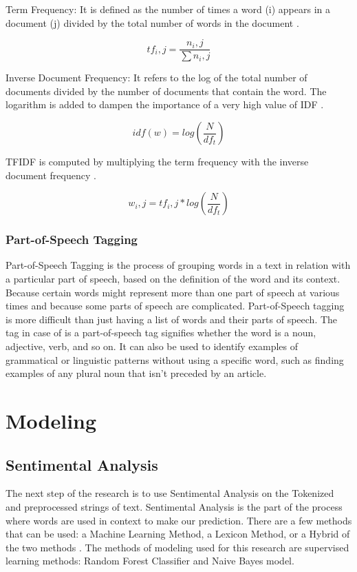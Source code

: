 \documentclass{article}
\begin{document}
Term Frequency: It is defined as the number of times a word (i) appears in a document (j) divided by the total number of words in the document \cite{11}.

\[t f_i,j = \frac{n_i,j}{\sum n_i,j}\]
     

Inverse Document Frequency: It refers to the log of the total number of documents divided by the number of documents that contain the word. The logarithm is added to dampen the importance of a very high value of IDF \cite{11}.

\[idf(w) = log(\frac{N}{df_t})\]
      

TFIDF is computed by multiplying the term frequency with the inverse document frequency \cite{11}.

\[w_i,j = {tf_i,j} * log(\frac{N}{df_t})\]



\subsubsection{Part-of-Speech Tagging}

Part-of-Speech Tagging is the process of grouping words in a text in relation with a particular part of speech, based on the definition of the word and its context. Because certain words might represent more than one part of speech at various times and because some parts of speech are complicated. Part-of-Speech tagging is more difficult than just having a list of words and their parts of speech. The tag in case of is a part-of-speech tag signifies whether the word is a noun, adjective, verb, and so on. It can also be used to identify examples of grammatical or linguistic patterns without using a specific word, such as finding examples of any plural noun that isn't preceded by an article.



\section{Modeling}

\subsection{Sentimental Analysis}
The next step of the research is to use Sentimental Analysis on the Tokenized and preprocessed strings of text. Sentimental Analysis is the part of the process where words are used in context to make our prediction. There are a few methods that can be used: a Machine Learning Method, a Lexicon Method, or a Hybrid of the two methods \cite{1}. The methods of modeling used for this research are supervised learning methods: Random Forest Classifier and Naive Bayes model.
\end{document}
